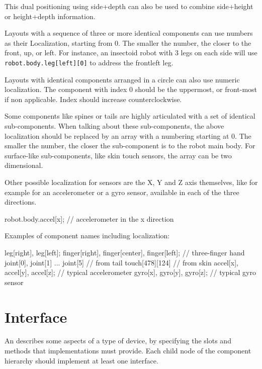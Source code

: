 This dual positioning using side+depth can also be used to combine
side+height or height+depth information.

Layouts with a sequence of three or more identical components can use
numbers as their Localization, starting from 0.  The smaller the number, the
closer to the front, up, or left. For instance, an insectoid robot with 3
legs on each side will use \lstinline{robot.body.leg[left][0]} to address the
frontleft leg.

Layouts with identical components arranged in a circle can also use numeric
localization. The component with index 0 should be the uppermost, or
front-most if non applicable. Index should increase counterclockwise.

Some components like spines or tails are highly articulated with a set of
identical sub-components. When talking about these sub-components, the above
localization should be replaced by an array with a numbering starting at
0. The smaller the number, the closer the sub-component is to the robot main
body. For surface-like sub-components, like skin touch sensors, the array
can be two dimensional.


Other possible localization for sensors are the X, Y and Z axis
themselves, like for example for an accelerometer or a gyro sensor,
available in each of the three directions.

\begin{urbiunchecked}
robot.body.accel[x]; // accelerometer in the x direction
\end{urbiunchecked}


Examples of component names including localization:

\begin{urbiunchecked}
leg[right], leg[left];
finger[right], finger[center], finger[left];  // three-finger hand
joint[0], joint[1] ... joint[5]               // from tail
touch[478][124]                               // from skin
accel[x], accel[y], accel[z];                 // typical accelerometer
gyro[x], gyro[y], gyro[z];                    // typical gyro sensor
\end{urbiunchecked}

\section{Interface}
\label{sec:interface}

An  describes some aspects of a type of device, by specifying
the slots and methods that implementations must provide. Each child node of
the component hierarchy should implement at least one interface.

